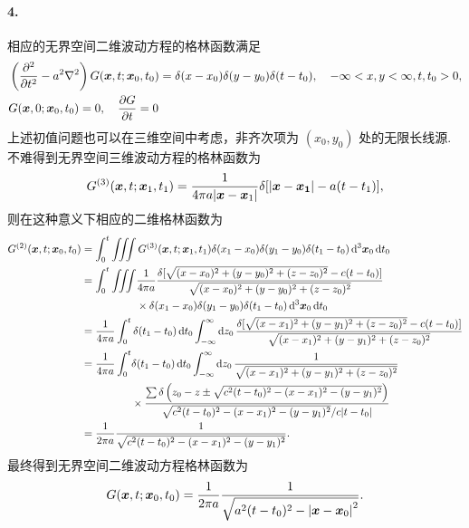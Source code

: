 \documentclass[12pt]{article}
\begin{document}
\paragraph{4.}
相应的无界空间二维波动方程的格林函数满足
\begin{align*}
	&\left(\pdv[2]{t} - a^2 \laplacian\right) G(\vb*{x}, t; \vb*{x}_0, t_0) = \delta(x - x_0) \delta(y - y_0) \delta(t - t_0), \quad -\infty < x, y < \infty, t, t_0 > 0, \\
	&G(\vb*{x}, 0; \vb*{x}_0, t_0) = 0, \quad \pdv{G}{t}(\vb*{x}, 0; \vb*{x}_0, t_0) = 0
\end{align*}
上述初值问题也可以在三维空间中考虑，非齐次项为 $(x_0, y_0)$ 处的无限长线源.
不难得到无界空间三维波动方程的格林函数为
\begin{equation*}
	G^{(3)}(\vb*{x}, t; \vb*{x}_1, t_1) = \frac{1}{4\pi a\abs{\vb*{x} - \vb*{x}_1}} \delta[\abs{\vb*{x} - \vb*{x_1}} - a(t - t_1)],
\end{equation*}
则在这种意义下相应的二维格林函数为
\begin{align*}
	G^{(2)}(\vb*{x}, t; \vb*{x}_0, t_0) &= \int_{0}^{t} \iiint G^{(3)}(\vb*{x}, t; \vb*{x}_1, t_1) \delta(x_1 - x_0) \delta(y_1 - y_0) \delta(t_1 - t_0) \dd[3]{\vb*{x}_0} \dd{t_0} \\
	&= \begin{aligned}[t]
	  \int_{0}^{t} \iiint &\frac{1}{4\pi a} \frac{\delta[\sqrt{(x - x_0)^2 + (y - y_0)^2 + (z - z_0)^2} - c(t - t_0)]}{\sqrt{(x - x_0)^2 + (y - y_0)^2 + (z - z_0)^2}} \\
	  &\times \delta(x_1 - x_0) \delta(y_1 - y_0) \delta(t_1 - t_0) \dd[3]{\vb*{x}_0} \dd{t_0} \\
	\end{aligned}\\
	&= \frac{1}{4\pi a} \int_{0}^{t} \delta(t_1 - t_0) \dd{t_0} \int_{-\infty}^{\infty} \dd{z_0} \frac{\delta[\sqrt{(x - x_1)^2 + (y - y_1)^2 + (z - z_0)^2} - c(t - t_0)]}{\sqrt{(x - x_1)^2 + (y - y_1)^2 + (z - z_0)^2}} \\
	&= \begin{aligned}[t]
		\frac{1}{4\pi a} \int_{0}^{t} &\delta(t_1 - t_0) \dd{t_0} \int_{-\infty}^{\infty} \dd{z_0} \frac{1}{\sqrt{(x - x_1)^2 + (y - y_1)^2 + (z - z_0)^2}} \\
		&\times \frac{\sum \delta \left(z_0 - z \pm \sqrt{c^2 (t - t_0)^2 - (x - x_1)^2 - (y - y_1)^2}\right)}{\sqrt{c^2 (t - t_0)^2 - (x - x_1)^2 - (y - y_1)^2} / c\abs{t - t_0}} 
	\end{aligned} \\
	&= \frac{1}{2\pi a} \frac{1}{\sqrt{c^2 (t - t_0)^2 - (x - x_1)^2 - (y - y_1)^2}}.
\end{align*}
最终得到无界空间二维波动方程格林函数为
\begin{equation*}
	G(\vb*{x}, t; \vb*{x}_0, t_0) = \frac{1}{2\pi a} \frac{1}{\sqrt{a^2 (t - t_0)^2 - \abs{\vb*{x} - \vb*{x}_0}^2}}.
\end{equation*}
\end{document}
